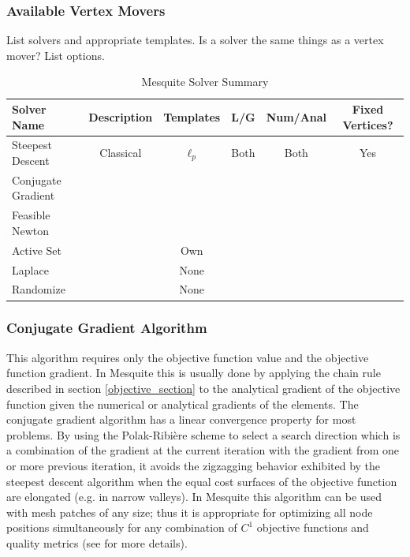 \documentclass[letter]{report}
\begin{document}
\subsubsection{Available Vertex Movers}

List solvers and appropriate templates. Is a solver the same things as a 
vertex mover? List options.

\begin{table}[h]
\begin{center}
\begin{tabular}{|l|c|c|c|c|c|}
\hline
Solver Name & Description & Templates & L/G & Num/Anal & Fixed Vertices? \\ \hline
Steepest Descent & Classical & $\ell_p$ & Both & Both & Yes \\
Conjugate Gradient & & & & & \\
Feasible Newton & & & & & \\
Active Set & & Own & & & \\
Laplace & & None & & & \\
Randomize & & None & & & \\
\hline
\end{tabular}
\caption{\label{Solvers} Mesquite Solver Summary}
\end{center}
\end{table}

\subsubsection{Conjugate Gradient Algorithm }
\label{append_conjgrad}
This algorithm requires only
the objective function value and the objective function gradient. 
In Mesquite this is usually done by applying the chain rule described in 
section \ref{objective_section} to the
analytical gradient of the objective function given the numerical or
analytical gradients of the elements. The conjugate gradient algorithm
has a linear convergence property for most problems. By using the
Polak-Ribi\`ere scheme to select a search direction which is a
combination of the gradient at the current iteration with the gradient
from one or more previous iteration, it avoids the zigzagging behavior
exhibited by the steepest descent algorithm when the equal cost
surfaces of the objective function are elongated (e.g. in narrow
valleys). In Mesquite this algorithm can be used with mesh patches of
any size; thus it is appropriate for optimizing all node positions 
simultaneously for any combination of $C^1$ objective functions and
quality metrics (see \cite{FeasNewt} for more details). 
\end{document}
